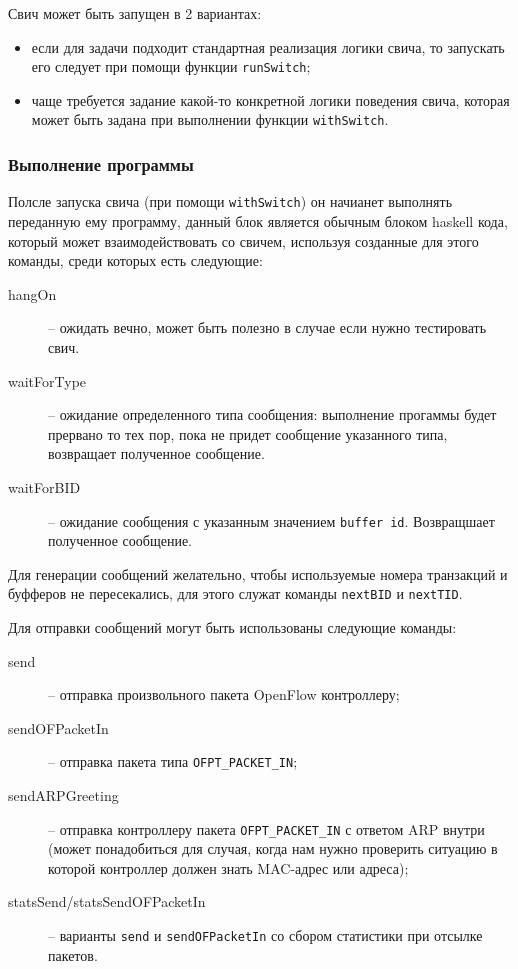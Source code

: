 \documentclass[9pt,a4paper]{article}
\begin{document}
Свич может быть запущен в 2 вариантах:

\begin{itemize}
  \item если для задачи подходит стандартная реализация логики свича, то запускать
    его следует при помощи функции \lstinline!runSwitch!;
  \item чаще требуется задание какой-то конкретной логики поведения свича, которая
    может быть задана при выполнении функции \lstinline!withSwitch!.
\end{itemize}


\subsubsection{Выполнение программы}
Полсле запуска свича (при помощи \lstinline!withSwitch!) он начианет выполнять
переданную ему программу, данный блок является обычным блоком haskell кода,
который может взаимодействовать со свичем, используя созданные для этого команды,
среди которых есть следующие:

\begin{description}
  \item[hangOn] -- ожидать вечно, может быть полезно в случае если нужно тестировать
свич.

  \item[waitForType] -- ожидание определенного типа сообщения: выполнение прогаммы
будет прервано то тех пор, пока не придет сообщение указанного типа, возвращает 
полученное сообщение.

  \item[waitForBID] -- ожидание сообщения с указанным значением \lstinline!buffer id!.
Возвращшает полученное сообщение.

\end{description}

Для генерации сообщений желательно, чтобы используемые номера транзакций и буфферов 
не пересекались, для этого служат команды \lstinline!nextBID! и \lstinline!nextTID!.

Для отправки сообщений могут быть использованы следующие команды:

\begin{description}

  \item[send] -- отправка произвольного пакета OpenFlow контроллеру;

  \item[sendOFPacketIn] -- отправка пакета типа \lstinline!OFPT_PACKET_IN!;

  \item[sendARPGreeting] -- отправка контроллеру пакета \lstinline!OFPT_PACKET_IN!
    с ответом ARP внутри (может понадобиться для случая, когда нам нужно проверить
    ситуацию в которой контроллер должен знать MAC-адрес или адреса);

  \item[statsSend/statsSendOFPacketIn] -- варианты \lstinline!send! и
    \lstinline!sendOFPacketIn! со сбором статистики при отсылке пакетов.

\end{description}
\end{document}
